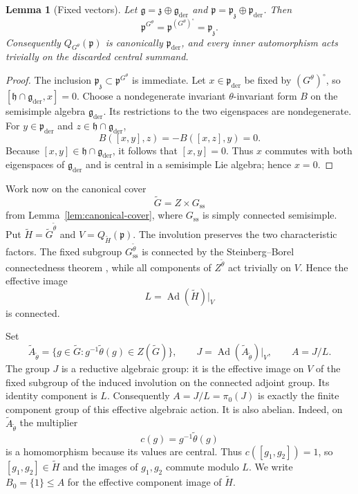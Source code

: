 \documentclass[10pt,a4paper]{amsart}
\numberwithin{equation}{section}
\newtheorem{lemma}[theorem]{Lemma}
\newcommand{\Ad}{\operatorname{Ad}}
\newcommand{\fg}{\mathfrak g}
\newcommand{\fz}{\mathfrak z}
\newcommand{\fh}{\mathfrak h}
\newcommand{\fp}{\mathfrak p}
\begin{document}
\begin{lemma}[Fixed vectors]\label{lem:fixed-vectors}
Let $\fg=\fz\oplus\fg_{\mathrm{der}}$ and
$\fp=\fp_{\fz}\oplus\fp_{\mathrm{der}}$.  Then
\[
  \fp^{G^\theta}=\fp^{(G^\theta)^\circ}=\fp_{\fz}.
\]
Consequently $Q_{G^\theta}(\fp)$ is canonically $\fp_{\mathrm{der}}$, and every
inner automorphism acts trivially on the discarded central summand.
\end{lemma}

\begin{proof}
The inclusion $\fp_{\fz}\subset\fp^{G^\theta}$ is immediate.  Let
$x\in\fp_{\mathrm{der}}$ be fixed by $(G^\theta)^\circ$, so
$[\fh\cap\fg_{\mathrm{der}},x]=0$.  Choose a nondegenerate invariant
$\theta$-invariant form $B$ on the semisimple algebra $\fg_{\mathrm{der}}$.
Its restrictions to the two eigenspaces are nondegenerate.  For
$y\in\fp_{\mathrm{der}}$ and $z\in\fh\cap\fg_{\mathrm{der}}$,
\[
  B([x,y],z)=-B([x,z],y)=0.
\]
Because $[x,y]\in\fh\cap\fg_{\mathrm{der}}$, it follows that $[x,y]=0$.
Thus $x$ commutes with both eigenspaces of $\fg_{\mathrm{der}}$ and is central
in a semisimple Lie algebra; hence $x=0$.
\end{proof}

Work now on the canonical cover
\[
 \widetilde G=Z\times G_{\mathrm{ss}}
\]
from Lemma~\ref{lem:canonical-cover}, where $G_{\mathrm{ss}}$ is simply
connected semisimple.  Put $\widetilde H=\widetilde G^{\widetilde\theta}$ and
$V=Q_{\widetilde H}(\fp)$.  The involution preserves the two characteristic
factors.  The fixed subgroup $G_{\mathrm{ss}}^{\widetilde\theta}$ is connected
by the Steinberg--Borel connectedness theorem \cite{Borel,Steinberg}, while all
components of $Z^{\widetilde\theta}$ act trivially on $V$.  Hence the effective
image
\[
 L=\Ad(\widetilde H)|_V
\]
is connected.

Set
\[
 \widetilde A_{\widetilde\theta}
 =\{g\in\widetilde G:g^{-1}\widetilde\theta(g)\in Z(\widetilde G)\},
 \qquad
 J=\Ad(\widetilde A_{\widetilde\theta})|_V,
 \qquad A=J/L.
\]
The group $J$ is a reductive algebraic group: it is the effective image on
$V$ of the fixed subgroup of the induced involution on the connected adjoint
group.  Its identity component is $L$.  Consequently
$A=J/L=\pi_0(J)$ is exactly the finite component group of this effective
algebraic action.
It is also abelian.  Indeed, on $\widetilde A_{\widetilde\theta}$ the multiplier
\[
 c(g)=g^{-1}\widetilde\theta(g)
\]
is a homomorphism because its values are central.  Thus
$c([g_1,g_2])=1$, so $[g_1,g_2]\in\widetilde H$ and the images of $g_1,g_2$
commute modulo $L$.  We write $B_0=\{1\}\leq A$ for the effective component
image of $\widetilde H$.
\end{document}

